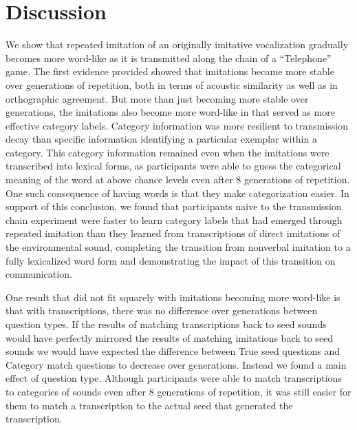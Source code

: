 \documentclass[10pt,letterpaper]{article}
\begin{document}
\section{Discussion}\label{discussion}

We show that repeated imitation of an originally imitative vocalization
gradually becomes more word-like as it is transmitted along the chain of
a ``Telephone'' game. The first evidence provided showed that imitations
became more stable over generations of repetition, both in terms of
acoustic similarity as well as in orthographic agreement. But more than
just becoming more stable over generations, the imitations also become
more word-like in that served as more effective category labels.
Category information was more resilient to transmission decay than
specific information identifying a particular exemplar within a
category. This category information remained even when the imitations
were transcribed into lexical forms, as participants were able to guess
the categorical meaning of the word at above chance levels even after 8
generations of repetition. One such consequence of having words is that
they make categorization easier. In support of this conclusion, we found
that participants naive to the transmission chain experiment were faster
to learn category labels that had emerged through repeated imitation
than they learned from transcriptions of direct imitations of the
environmental sound, completing the transition from nonverbal imitation
to a fully lexicalized word form and demonstrating the impact of this
transition on communication.

One result that did not fit squarely with imitations becoming more
word-like is that with transcriptions, there was no difference over
generations between question types. If the results of matching
transcriptions back to seed sounds would have perfectly mirrored the
results of matching imitations back to seed sounds we would have
expected the difference between True seed questions and Category match
questions to decrease over generations. Instead we found a main effect
of question type. Although participants were able to match
transcriptions to categories of sounds even after 8 generations of
repetition, it was still easier for them to match a transcription to the
actual seed that generated the transcription.
\end{document}
